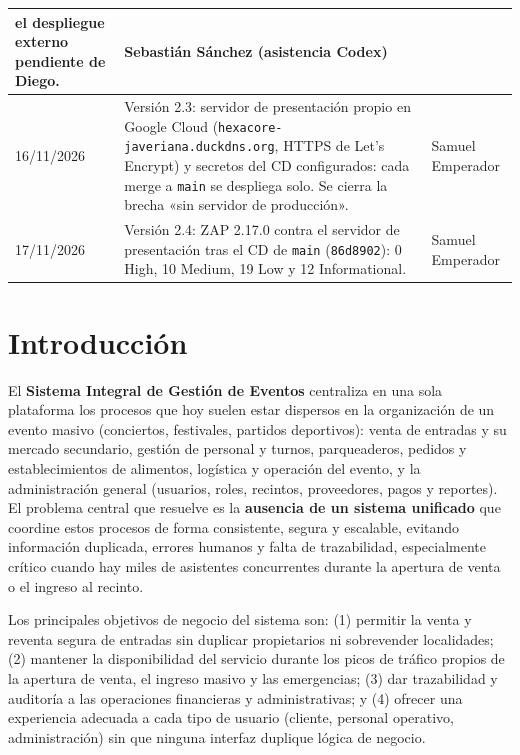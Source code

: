 \documentclass[11pt,a4paper]{article}
\begin{document}
\begin{center}
\begin{longtable}{|p{2.5cm}|p{7cm}|p{4cm}|}
el despliegue externo pendiente de Diego. & Sebastián Sánchez (asistencia Codex) \\
\hline
16/11/2026 & Versión 2.3: servidor de presentación propio en Google Cloud
(\texttt{hexacore-javeriana.duckdns.org}, HTTPS de Let's Encrypt) y secretos del CD
configurados: cada merge a \texttt{main} se despliega solo. Se cierra la brecha «sin
servidor de producción». & Samuel Emperador \\
\hline
17/11/2026 & Versión 2.4: ZAP 2.17.0 contra el servidor de presentación tras el CD de
\texttt{main} (\texttt{86d8902}): 0 High, 10 Medium, 19 Low y 12 Informational. & Samuel Emperador \\
\hline
\end{longtable}
\end{center}

\newpage
\renewcommand{\contentsname}{Tabla de Contenidos}
\tableofcontents
\thispagestyle{empty}
\newpage

\section{Introducción}

El \textbf{Sistema Integral de Gestión de Eventos} centraliza en una sola plataforma los procesos
que hoy suelen estar dispersos en la organización de un evento masivo (conciertos, festivales,
partidos deportivos): venta de entradas y su mercado secundario, gestión de personal y turnos,
parqueaderos, pedidos y establecimientos de alimentos, logística y operación del evento, y la
administración general (usuarios, roles, recintos, proveedores, pagos y reportes). El problema
central que resuelve es la \textbf{ausencia de un sistema unificado} que coordine estos procesos
de forma consistente, segura y escalable, evitando información duplicada, errores humanos y falta
de trazabilidad, especialmente crítico cuando hay miles de asistentes concurrentes durante la
apertura de venta o el ingreso al recinto.

Los principales objetivos de negocio del sistema son: (1) permitir la venta y reventa segura de
entradas sin duplicar propietarios ni sobrevender localidades; (2) mantener la disponibilidad del
servicio durante los picos de tráfico propios de la apertura de venta, el ingreso masivo y las
emergencias; (3) dar trazabilidad y auditoría a las operaciones financieras y administrativas; y
(4) ofrecer una experiencia adecuada a cada tipo de usuario (cliente, personal operativo,
administración) sin que ninguna interfaz duplique lógica de negocio.
\end{document}
